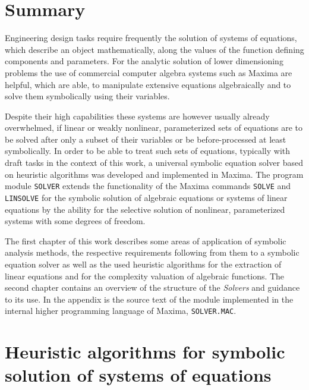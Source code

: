 \documentclass[11pt]{report}           %
\newcounter{problem}
\begin{document}
\cleardoublepage

\chapter*{Summary}
\thispagestyle{empty}

Engineering design tasks  require frequently the solution of systems of equations, which describe an object mathematically, along the values of the function defining components and parameters. For the analytic solution of lower dimensioning problems the use of commercial computer algebra systems such as Maxima are helpful, which are able, to manipulate extensive equations algebraically and to solve them symbolically using their variables.

Despite their high capabilities these systems are however usually already overwhelmed, if linear or weakly nonlinear, parameterized sets of equations are to be solved after only a subset of their variables or be before-processed at least symbolically. In order to be able to treat such sets of equations, typically with draft tasks in the context of this work, a universal symbolic equation solver based on heuristic algorithms was developed and implemented in Maxima. The program module  \verb+SOLVER+ extends the functionality of the Maxima commands \verb+SOLVE+ and  \verb+LINSOLVE+  for the symbolic solution of algebraic equations or  systems of linear equations by the ability for the selective solution of nonlinear, parameterized systems with some degrees of freedom.

The first chapter of this work describes some areas of application of symbolic analysis methods, the respective
 requirements following from them to a symbolic equation solver as well as the used heuristic algorithms for the extraction of linear equations and for the complexity valuation of algebraic functions. The second chapter contains an overview of the structure of the {\em Solvers} and guidance to its use. In the appendix is the source text of the module implemented in the internal higher programming language of Maxima, \verb+SOLVER.MAC+.


\cleardoublepage
\pagestyle{headings}
\tableofcontents

\cleardoublepage

\chapter[Heuristic algorithms]{Heuristic algorithms for
symbolic solution of systems of equations}

\end{document}
